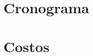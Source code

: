 \documentclass[letter,12pt]{book}
\begin{document}
  
%   
  
  \chapter{Cronograma}
  
  
  
  \chapter{Costos}
  \label{cap:costos}
  
  
  
  
  
  
  
  
  
  
  
  
%   
  
  
  
\end{document}
